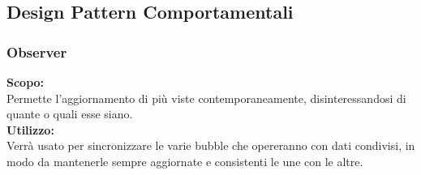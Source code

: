 \subsection{Design Pattern Comportamentali}

\subsubsection{Observer}
\textbf{Scopo:} \\
Permette l'aggiornamento di più viste contemporaneamente, disinteressandosi di quante o quali esse siano.\\
\textbf{Utilizzo:} \\
Verrà usato per sincronizzare le varie bubble che opereranno con dati condivisi, in modo da mantenerle sempre aggiornate e consistenti le une con le altre.